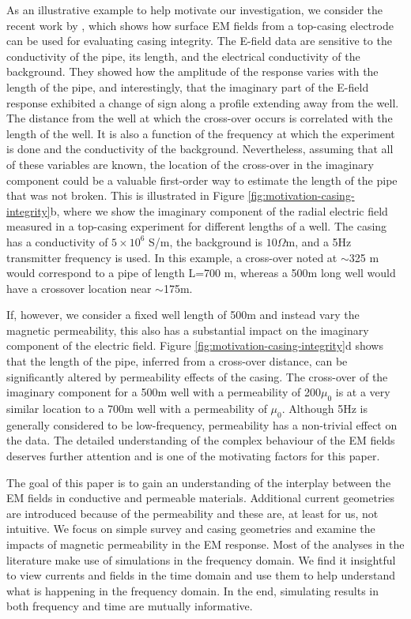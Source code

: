 \documentclass[onecolumn, extra, mreferee]{gji}
\begin{document}
As an illustrative example to help motivate our investigation, we consider the recent work by \cite{wilt_casing_2020}, which shows how surface EM fields from a top-casing electrode can be used for evaluating casing integrity. The E-field data are sensitive to the conductivity of the pipe, its length, and the electrical conductivity of the background. They showed how the amplitude of the response varies with the length of the pipe, and interestingly, that the imaginary part of the E-field response exhibited a change of sign along a profile extending away from the well. The distance from the well at which the cross-over occurs is correlated with the length of the well. It is also a function of the frequency at which the experiment is done and the conductivity of the background. Nevertheless, assuming that all of these variables are known, the location of the cross-over in the imaginary component could be a valuable first-order way to estimate the length of the pipe that was not broken. This is illustrated in Figure \ref{fig:motivation-casing-integrity}b, where we show the imaginary component of the radial electric field measured in a top-casing experiment for different lengths of a well. The casing has a conductivity of $5\times 10^6$  S/m, the background is $10  \Omega$m, and a 5Hz transmitter frequency is used. In this example, a cross-over noted at $\sim$325 m would correspond to a pipe of length L=700 m, whereas a 500m long well would have a crossover location near $\sim$175m.



If, however, we consider a fixed well length of 500m and instead vary the magnetic permeability, this also has a substantial impact on the imaginary component of the electric field. Figure \ref{fig:motivation-casing-integrity}d shows that the length of the pipe, inferred from a cross-over distance, can be significantly altered by permeability effects of the casing. The cross-over of the imaginary component for a 500m well with a permeability of 200$\mu_0$ is at a very similar location to a 700m well with a permeability of $\mu_0$. Although 5Hz is generally considered to be low-frequency, permeability has a non-trivial effect on the data. The detailed understanding of the complex behaviour of the EM fields deserves further attention and is one of the motivating factors for this paper.

The goal of this paper is to gain an understanding of the interplay between the EM fields in conductive and permeable materials. Additional current geometries are introduced because of the permeability and these are, at least for us, not intuitive. We focus on simple survey and casing geometries and examine the impacts of magnetic permeability in the EM response. Most of the analyses in the literature make use of simulations in the frequency domain. We find it insightful to view currents and fields in the time domain and use them to help understand what is happening in the frequency domain. In the end, simulating results in both frequency and time are mutually informative.
\end{document}
